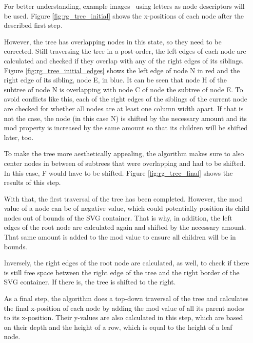 For better understanding, example images~\cite{reingold_tilford_lim} using letters as node descriptors will be used. Figure \ref{fig:rg_tree_initial} shows the x-positions of each node after the described first step.

However, the tree has overlapping nodes in this state, so they need to be corrected. Still traversing the tree in a post-order, the left edges of each node are calculated and checked if they overlap with any of the right edges of its siblings. Figure \ref{fig:rg_tree_initial_edges} shows the left edge of node N in red and the right edge of its sibling, node E, in blue.
It can be seen that node H of the subtree of node N is overlapping with node C of node the subtree of node E. To avoid conflicts like this, each of the right edges of the siblings of the current node are checked for whether all nodes are at least one column width apart. If that is not the case, the node (in this case N) is shifted by the necessary amount and its mod property is increased by the same amount so that its children will be shifted later, too.

To make the tree more aesthetically appealing, the algorithm makes sure to also center nodes in between of subtrees that were overlapping and had to be shifted. In this case, F would have to be shifted. Figure \ref{fig:rg_tree_final} shows the results of this step.

With that, the first traversal of the tree has been completed. However, the mod value of a node can be of negative value, which could potentially position its child nodes out of bounds of the SVG container. That is why, in addition, the left edges of the root node are calculated again and shifted by the necessary amount. That same amount is added to the mod value to ensure all children will be in bounds.

Inversely, the right edges of the root node are calculated, as well, to check if there is still free space between the right edge of the tree and the right border of the SVG container. If there is, the tree is shifted to the right.

As a final step, the algorithm does a top-down traversal of the tree and calculates the final x-position of each node by adding the mod value of all its parent nodes to its x-position. Their y-values are also calculated in this step, which are based on their depth and the height of a row, which is equal to the height of a leaf node. 

